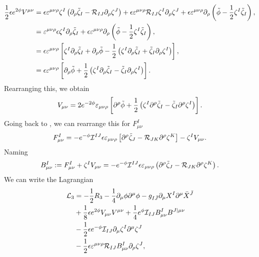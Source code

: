 \begin{equation*}
	\begin{aligned}
		\frac{1}{2} \epsilon e^{2 \phi} V^{\mu \nu} &= \epsilon \varepsilon^{\mu\nu\rho} \zeta^I \left(\partial_\rho \tilde{\zeta}_I - {\cal R}_{IJ} \partial_\rho \zeta^J \right) + \epsilon \varepsilon^{\mu\nu\rho} {\cal R}_{IJ} \zeta^I \partial_\rho \zeta^J + \epsilon \varepsilon^{\mu\nu\rho} \partial_\rho \left(\tilde{\phi} - \frac{1}{2} \zeta^I \tilde{\zeta}_I \right), \\
		&= \varepsilon^{\mu\nu\rho} \epsilon \zeta^I \partial_\rho \tilde{\zeta}_I + \epsilon \varepsilon^{\mu\nu\rho} \partial_\rho \left(\tilde{\phi} - \frac{1}{2} \zeta^I \tilde{\zeta}_I \right), \\
		&= \epsilon \varepsilon^{\mu\nu\rho} \left[ \zeta^I \partial_\rho \tilde{\zeta}_I + \partial_\rho \tilde{\phi} - \frac{1}{2} \left(\zeta^I \partial_\rho \tilde{\zeta}_I + \tilde{\zeta}_I \partial_\rho \zeta^I \right) \right], \\
		&= \epsilon \varepsilon^{\mu\nu\rho} \left[ \partial_\rho \tilde{\phi} + \frac{1}{2} \left(\zeta^I \partial_\rho \tilde{\zeta}_I - \tilde{\zeta}_I \partial_\rho \zeta^I \right) \right]. \\
	\end{aligned}
\end{equation*}
Rearranging this, we obtain
\begin{equation*}
	V_{\mu \nu} = 2 e^{-2\phi} \varepsilon_{\mu \nu \rho} \left[ \partial^\rho \tilde{\phi} + \frac{1}{2} \left(\zeta^I \partial^\rho \tilde{\zeta}_I - \tilde{\zeta}_I \partial^\rho \zeta^I \right) \right].
\end{equation*}
Going back to , we can rearrange this for $F_{\mu \nu}^I$
\begin{equation*}
	F^I_{\mu \nu} = - e^{-\phi} {\cal I}^{IJ} \epsilon \varepsilon_{\mu\nu\rho} \left[\partial^\rho \tilde{\zeta}_J - {\cal R}_{JK} \partial^\rho \zeta^K \right] - \zeta^I V_{\mu \nu}.
\end{equation*}
Naming
\begin{equation*}
B^I_{\mu \nu} := F^{I}_{\mu \nu} + \zeta^I V_{\mu \nu} = - e^{-\phi} {\cal I}^{IJ} \epsilon \varepsilon_{\mu\nu\rho} \left( \partial^\rho \tilde{\zeta}_J - {\cal R}_{JK} \partial^\rho \zeta^K \right).
\end{equation*}
We can write the Lagrangian
\begin{equation*}
\begin{aligned}
 {\cal L}_3 &= -\frac{1}{2} R_3 - \frac{1}{4}\partial_\mu \phi \partial^\mu \phi - g_{I\bar{J}} \partial_\mu X^I \partial^\mu \bar{X}^{\bar{J}} \\
 &+ \frac{1}{8}\epsilon e^{2\phi}V_{\mu\nu} V^{\mu\nu} + \frac{1}{4}e^\phi {\cal I}_{IJ} B^I_{\mu \nu} B^{J |\mu \nu} \\
 &- \frac{1}{2}\epsilon e^{-\phi} {\cal I}_{IJ} \partial_\mu\zeta^I \partial^\mu \zeta^J \\
 &- \frac{1}{2} \epsilon {\varepsilon}^{\mu\nu\rho} {\cal R}_{IJ} B^I_{\mu \nu}\partial_\rho\zeta^J,
 \end{aligned}
\end{equation*}
